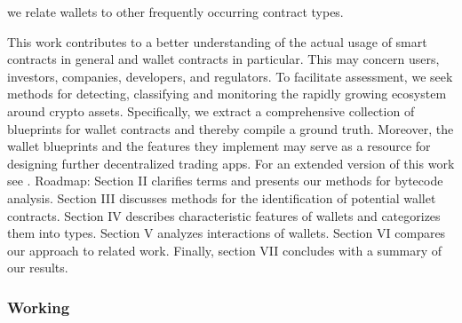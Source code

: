 \documentclass[12pt]{article}
\begin{document}
we relate wallets to other frequently occurring contract types.\par
This work contributes to a better understanding of the
actual usage of smart contracts in general and wallet contracts
in particular. This may concern users, investors, companies,
developers, and regulators. To facilitate assessment, we seek
methods for detecting, classifying and monitoring the rapidly
growing ecosystem around crypto assets. Specifically, we
extract a comprehensive collection of blueprints for wallet
contracts and thereby compile a ground truth. Moreover, the
wallet blueprints and the features they implement may serve
as a resource for designing further decentralized trading apps.
For an extended version of this work see .
Roadmap: Section II clarifies terms and presents our methods for bytecode analysis. Section III discusses methods for
the identification of potential wallet contracts. Section IV
describes characteristic features of wallets and categorizes
them into types. Section V analyzes interactions of wallets.
Section VI compares our approach to related work. Finally,
section VII concludes with a summary of our results.




\newpage
\subsubsection{Working}
\end{document}
